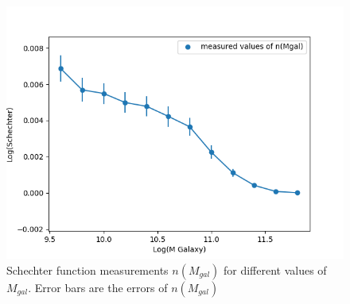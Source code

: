 \documentclass[12pt]{article}
\begin{document}
\begin{figure}
    \centering
    \includegraphics{HW2_schecterfit_data.png}
    \caption{Schechter function measurements $n(M_{gal})$ for different values of $M_{gal}$. Error bars are the errors of $n(M_{gal})$}
    \label{fig:data}
\end{figure}{}
\end{document}
